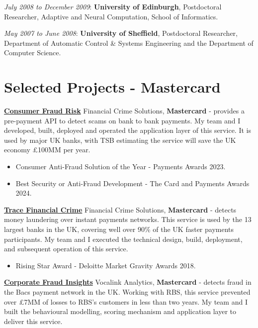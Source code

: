 \documentclass[line, overlapped]{res}
\providecommand{\tightlist}{%
  \setlength{\itemsep}{0pt}\setlength{\parskip}{0pt}}
\begin{document}
\begin{resume}
  \emph{July 2008 to December 2009}: \textbf{University of Edinburgh},
  Postdoctoral Researcher, Adaptive and Neural Computation, School of
  Informatics.

  \emph{May 2007 to June 2008}: \textbf{University of Sheffield},
  Postdoctoral Researcher, Department of Automatic Control \& Systems
  Engineering and the Department of Computer Science.

\section{Selected Projects - Mastercard}

	\href{https://www.bloomberg.com/news/articles/2023-07-05/mastercard-s-ai-tool-helps-nine-british-banks-tackle-scams}{\textbf{Consumer Fraud Risk}} Financial Crime Solutions, \textbf{Mastercard} - provides a pre-payment API to detect scams on bank to bank payments. My team and I developed, built, deployed and operated the application layer of this service. It is used by major UK banks, with TSB estimating the service will save the UK economy £100MM per year.
  \begin{itemize}
  \tightlist
  \item
    Consumer Anti-Fraud Solution of the Year - Payments Awards 2023.
  \item
    Best Security or Anti-Fraud Development - The Card and Payments Awards 2024.
  \end{itemize}
	\href{https://www.vocalink.com/news-insights/case-studies/case-study-mits/}{\textbf{Trace Financial Crime}} Financial Crime Solutions, \textbf{Mastercard} - detects money laundering over instant payments networks. This service is used by the 13 largest banks in the UK, covering well over 90\% of the UK faster payments participants. My team and I executed the technical design, build, deployment, and subsequent operation of this service.

  \begin{itemize}
  \tightlist
  \item
    Rising Star Award - Deloitte Market Gravity Awards 2018.
  \end{itemize}
	\href{https://www.thetimes.co.uk/article/rbs-system-pushes-back-against-invoice-fraudsters-88h92l5ml}{\textbf{Corporate Fraud Insights}} Vocalink Analytics, \textbf{Mastercard} - detects fraud in the Bacs payment network in the UK. Working with RBS, this service prevented over £7MM of losses to RBS’s customers in less than two years. My team and I built the behavioural modelling, scoring mechanism and application layer to deliver this service. 


\end{resume}
\end{document}
